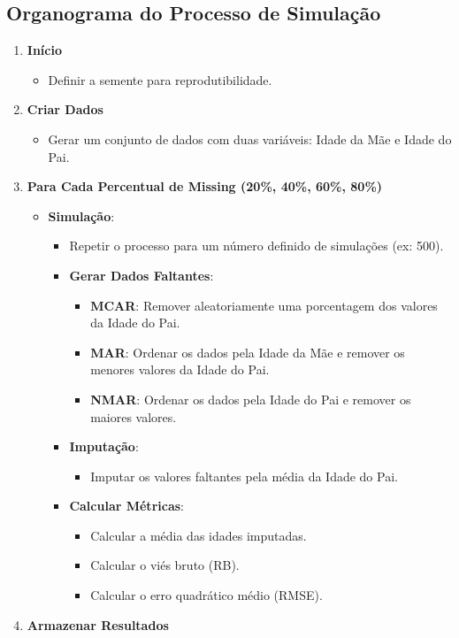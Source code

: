 \documentclass[11pt]{article}
\begin{document}
\subsection*{Organograma do Processo de Simulação}
\begin{enumerate}
  \item \textbf{Início}

  \begin{itemize}
    \item Definir a semente para reprodutibilidade.
  \end{itemize}
  \item \textbf{Criar Dados}

  \begin{itemize}
    \item Gerar um conjunto de dados com duas variáveis: Idade da Mãe e Idade do Pai.
  \end{itemize}
  \item \textbf{Para Cada Percentual de Missing (20\%, 40\%, 60\%, 80\%)}

  \begin{itemize}
    \item \textbf{Simulação}:
    \begin{itemize}
      \item Repetir o processo para um número definido de simulações (ex: 500).
      \item \textbf{Gerar Dados Faltantes}:
      \begin{itemize}
        \item \textbf{MCAR}: Remover aleatoriamente uma porcentagem dos valores da Idade do Pai.
        \item \textbf{MAR}: Ordenar os dados pela Idade da Mãe e remover os menores valores da Idade do Pai.
        \item \textbf{NMAR}: Ordenar os dados pela Idade do Pai e remover os maiores valores.
      \end{itemize}
      \item \textbf{Imputação}:
      \begin{itemize}
        \item Imputar os valores faltantes pela média da Idade do Pai.
      \end{itemize}
      \item \textbf{Calcular Métricas}:
      \begin{itemize}
        \item Calcular a média das idades imputadas.
        \item Calcular o viés bruto (RB).
        \item Calcular o erro quadrático médio (RMSE).
      \end{itemize}
    \end{itemize}
  \end{itemize}
  \item \textbf{Armazenar Resultados}


\end{enumerate}
\end{document}
